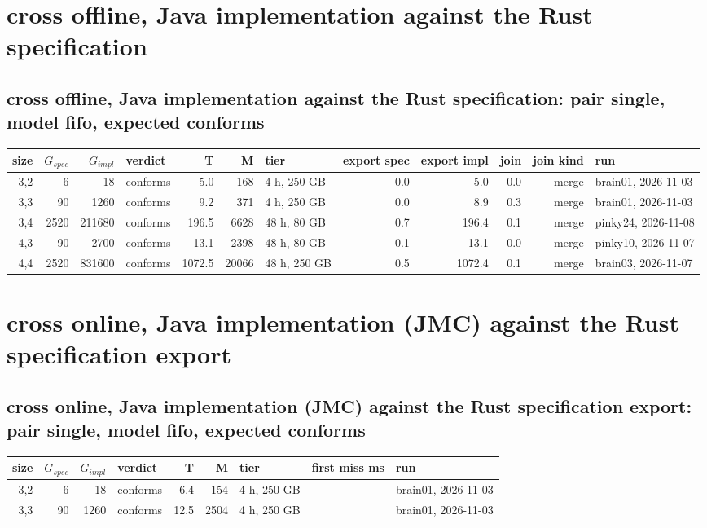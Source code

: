 \documentclass[10pt]{article}
\begin{document}
\section*{cross offline, Java implementation against the Rust specification}
\subsection*{cross offline, Java implementation against the Rust specification: pair \textsf{single}, model fifo, expected conforms}
\begin{longtable}{@{}rrrlrrlrrrrl@{}}
\toprule
size & $G_{\mathit{spec}}$ & $G_{\mathit{impl}}$ & verdict & T & M & tier & export spec & export impl & join & join kind & run \\
\midrule
\endhead
\color{blue} 3,2 & 6 & 18 & conforms & 5.0 & 168 & 4 h, 250 GB & 0.0 & 5.0 & 0.0 & merge & brain01, 2026-11-03 \\
\color{blue} 3,3 & 90 & 1260 & conforms & 9.2 & 371 & 4 h, 250 GB & 0.0 & 8.9 & 0.3 & merge & brain01, 2026-11-03 \\
\color{red} 3,4 & 2520 & 211680 & conforms & 196.5 & 6628 & 48 h, 80 GB & 0.7 & 196.4 & 0.1 & merge & pinky24, 2026-11-08 \\
\color{red} 4,3 & 90 & 2700 & conforms & 13.1 & 2398 & 48 h, 80 GB & 0.1 & 13.1 & 0.0 & merge & pinky10, 2026-11-07 \\
\color{blue} 4,4 & 2520 & 831600 & conforms & 1072.5 & 20066 & 48 h, 250 GB & 0.5 & 1072.4 & 0.1 & merge & brain03, 2026-11-07 \\
\bottomrule
\end{longtable}
\section*{cross online, Java implementation (JMC) against the Rust specification export}
\subsection*{cross online, Java implementation (JMC) against the Rust specification export: pair \textsf{single}, model fifo, expected conforms}
\begin{longtable}{@{}rrrlrrlrl@{}}
\toprule
size & $G_{\mathit{spec}}$ & $G_{\mathit{impl}}$ & verdict & T & M & tier & first miss ms & run \\
\midrule
\endhead
\color{blue} 3,2 & 6 & 18 & conforms & 6.4 & 154 & 4 h, 250 GB &  & brain01, 2026-11-03 \\
\color{blue} 3,3 & 90 & 1260 & conforms & 12.5 & 2504 & 4 h, 250 GB &  & brain01, 2026-11-03 \\
\bottomrule
\end{longtable}
\end{document}
